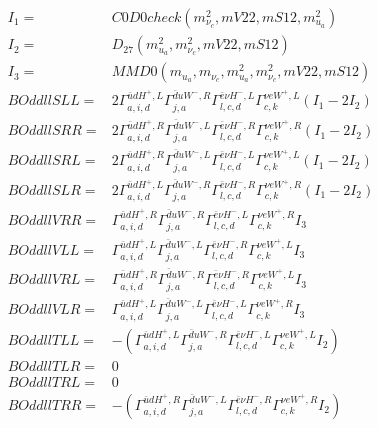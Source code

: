 \documentclass[A4,landscape]{article}
\begin{document}
\begin{align} 
I_1 = & C0D0check(m^2_{\nu_{{c}}}, mV22, mS12, m^2_{u_{{a}}}) \\ 
I_2 = & D_{27}(m^2_{u_{{a}}}, m^2_{\nu_{{c}}}, mV22, mS12) \\ 
I_3 = & MMD0(m_{u_{{a}}}, m_{\nu_{{c}}}, m^2_{u_{{a}}}, m^2_{\nu_{{c}}}, mV22, mS12) \\ 
  BOddllSLL= & 2  \Gamma^{\bar{u}d H^+,L}_{a, i, d} \Gamma^{\bar{d}u W^- ,R}_{j, a} \Gamma^{\bar{e}\nu H^- ,L}_{l, c, d} \Gamma^{\nu e W^+,L}_{c, k} (I_1 - 2 I_2) \\ 
  BOddllSRR= & 2  \Gamma^{\bar{u}d H^+,R}_{a, i, d} \Gamma^{\bar{d}u W^- ,L}_{j, a} \Gamma^{\bar{e}\nu H^- ,R}_{l, c, d} \Gamma^{\nu e W^+,R}_{c, k} (I_1 - 2 I_2) \\ 
  BOddllSRL= & 2  \Gamma^{\bar{u}d H^+,R}_{a, i, d} \Gamma^{\bar{d}u W^- ,L}_{j, a} \Gamma^{\bar{e}\nu H^- ,L}_{l, c, d} \Gamma^{\nu e W^+,L}_{c, k} (I_1 - 2 I_2) \\ 
  BOddllSLR= & 2  \Gamma^{\bar{u}d H^+,L}_{a, i, d} \Gamma^{\bar{d}u W^- ,R}_{j, a} \Gamma^{\bar{e}\nu H^- ,R}_{l, c, d} \Gamma^{\nu e W^+,R}_{c, k} (I_1 - 2 I_2) \\ 
  BOddllVRR= &  \Gamma^{\bar{u}d H^+,R}_{a, i, d} \Gamma^{\bar{d}u W^- ,R}_{j, a} \Gamma^{\bar{e}\nu H^- ,L}_{l, c, d} \Gamma^{\nu e W^+,R}_{c, k} I_3 \\ 
  BOddllVLL= &  \Gamma^{\bar{u}d H^+,L}_{a, i, d} \Gamma^{\bar{d}u W^- ,L}_{j, a} \Gamma^{\bar{e}\nu H^- ,R}_{l, c, d} \Gamma^{\nu e W^+,L}_{c, k} I_3 \\ 
  BOddllVRL= &  \Gamma^{\bar{u}d H^+,R}_{a, i, d} \Gamma^{\bar{d}u W^- ,R}_{j, a} \Gamma^{\bar{e}\nu H^- ,R}_{l, c, d} \Gamma^{\nu e W^+,L}_{c, k} I_3 \\ 
  BOddllVLR= &  \Gamma^{\bar{u}d H^+,L}_{a, i, d} \Gamma^{\bar{d}u W^- ,L}_{j, a} \Gamma^{\bar{e}\nu H^- ,L}_{l, c, d} \Gamma^{\nu e W^+,R}_{c, k} I_3 \\ 
  BOddllTLL= & -( \Gamma^{\bar{u}d H^+,L}_{a, i, d} \Gamma^{\bar{d}u W^- ,R}_{j, a} \Gamma^{\bar{e}\nu H^- ,L}_{l, c, d} \Gamma^{\nu e W^+,L}_{c, k} I_2) \\ 
  BOddllTLR= & 0 \\ 
  BOddllTRL= & 0 \\ 
  BOddllTRR= & -( \Gamma^{\bar{u}d H^+,R}_{a, i, d} \Gamma^{\bar{d}u W^- ,L}_{j, a} \Gamma^{\bar{e}\nu H^- ,R}_{l, c, d} \Gamma^{\nu e W^+,R}_{c, k} I_2) \\ 
\end{align} 
\end{document}
